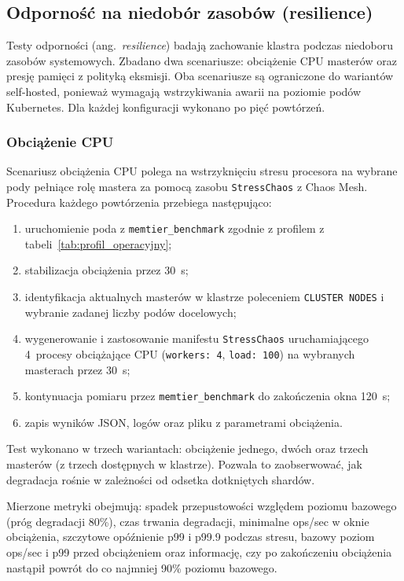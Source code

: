\subsection{Odporność na niedobór zasobów (resilience)}\label{subsec:resilience}

Testy odporności (ang.~\textit{resilience}) badają zachowanie klastra podczas niedoboru zasobów systemowych. Zbadano dwa scenariusze: obciążenie CPU masterów oraz presję pamięci z polityką eksmisji. Oba scenariusze są ograniczone do wariantów self-hosted, ponieważ wymagają wstrzykiwania awarii na poziomie podów Kubernetes. Dla każdej konfiguracji wykonano po pięć powtórzeń.

\subsubsection{Obciążenie CPU}

Scenariusz obciążenia CPU polega na wstrzyknięciu stresu procesora na wybrane pody pełniące rolę mastera za pomocą zasobu \texttt{StressChaos} z Chaos Mesh. Procedura każdego powtórzenia przebiega następująco:

\begin{enumerate}
    \item uruchomienie poda z \texttt{memtier\_benchmark} zgodnie z profilem z tabeli~\ref{tab:profil_operacyjny};
    \item stabilizacja obciążenia przez 30~s;
    \item identyfikacja aktualnych masterów w klastrze poleceniem \texttt{CLUSTER NODES} i wybranie zadanej liczby podów docelowych;
    \item wygenerowanie i zastosowanie manifestu \texttt{StressChaos} uruchamiającego 4~procesy obciążające CPU (\texttt{workers: 4}, \texttt{load: 100}) na wybranych masterach przez 30~s;
    \item kontynuacja pomiaru przez \texttt{memtier\_benchmark} do zakończenia okna 120~s;
    \item zapis wyników JSON, logów oraz pliku z parametrami obciążenia.
\end{enumerate}

Test wykonano w trzech wariantach: obciążenie jednego, dwóch oraz trzech masterów (z trzech dostępnych w klastrze). Pozwala to zaobserwować, jak degradacja rośnie w zależności od odsetka dotkniętych shardów.

Mierzone metryki obejmują: spadek przepustowości względem poziomu bazowego (próg degradacji 80\%), czas trwania degradacji, minimalne ops/sec w oknie obciążenia, szczytowe opóźnienie p99 i p99.9 podczas stresu, bazowy poziom ops/sec i p99 przed obciążeniem oraz informację, czy po zakończeniu obciążenia nastąpił powrót do co najmniej 90\% poziomu bazowego.

